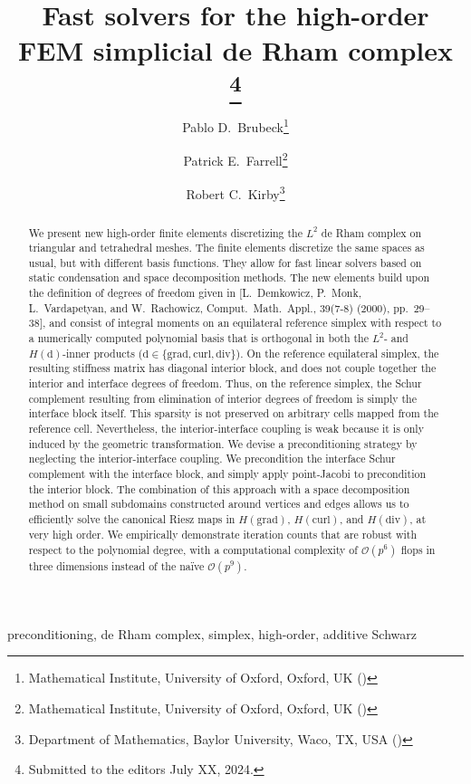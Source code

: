 \documentclass[review,onefignum,onetabnum,a4paper]{siamart190516}
\title{
   Fast solvers for the high-order FEM simplicial de Rham complex
\thanks{Submitted to the editors July XX, 2024.
      \funding{
         PDB and PEF were supported by EPSRC grant EP/W026260/1.
      }
   }
}
\author{Pablo D.\ Brubeck\thanks{
Mathematical Institute,
University of Oxford,
Oxford, UK (\email{brubeckmarti@maths.ox.ac.uk})
}
\and Patrick E.\ Farrell\thanks{
Mathematical Institute,
University of Oxford,
Oxford, UK (\email{patrick.farrell@maths.ox.ac.uk})
}
\and Robert C.\ Kirby\thanks{
Department of Mathematics,
Baylor University,
Waco, TX, USA (\email{robert\_kirby@baylor.edu})
}
}
\begin{document}
\maketitle

\begin{abstract}
We present new high-order finite elements discretizing the $L^2$ de Rham
complex on triangular and tetrahedral meshes. The finite elements discretize
the same spaces as usual, but with different basis functions. They allow for
fast linear solvers based on static condensation and space decomposition
methods. The new elements build upon the definition of degrees of freedom
given in [L.~Demkowicz, P.~Monk, L.~Vardapetyan, and W.~Rachowicz,
Comput.~Math.~Appl.,
39(7-8) (2000), pp.~29--38], and consist of integral moments
on an equilateral reference simplex with respect to a numerically computed
polynomial basis that is orthogonal in both the $L^2$- and
$H(\mathrm{d})$-inner products ($\mathrm{d} \in \{\mathrm{grad},
\mathrm{curl}, \mathrm{div}\}$). 
On the reference equilateral simplex, the
resulting stiffness matrix has diagonal interior block, and does not couple
together the interior and interface degrees of freedom. Thus, on the
reference simplex, the Schur complement resulting from elimination of
interior degrees of freedom is simply the interface block itself. This
sparsity is not preserved on arbitrary cells mapped from the reference cell.
Nevertheless, the interior-interface coupling is weak because it is only
induced by the geometric transformation. We devise a preconditioning
strategy by neglecting the interior-interface coupling. We precondition the
interface Schur complement with the interface block, and simply apply
point-Jacobi to precondition the interior block. The combination of this
approach with a space decomposition method on small subdomains constructed
around vertices and edges allows us to efficiently solve the
canonical Riesz maps in $H(\mathrm{grad})$, $H(\mathrm{curl})$, and
$H(\mathrm{div})$, at very high order. We empirically demonstrate iteration
counts that are robust with respect to the polynomial degree, with a computational complexity of $\mathcal{O}(p^{6})$ flops in three dimensions
instead of the na\"ive $\mathcal{O}(p^{9})$.
\end{abstract}

\begin{keywords}
   preconditioning, de Rham complex, simplex, high-order, additive Schwarz
\end{keywords}
\end{document}
